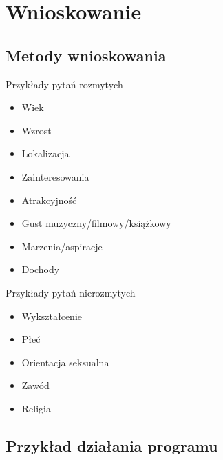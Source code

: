 \documentclass{beamer}
\begin{document}
\section{Wnioskowanie}

\subsection{Metody wnioskowania}

\begin{frame}

	\begin{block}{Przykłady pytań rozmytych}
		\begin{itemize}
		    \item Wiek
	        \item Wzrost
            \item Lokalizacja
            \item Zainteresowania
            \item Atrakcyjność
            \item Gust muzyczny/filmowy/książkowy
            \item Marzenia/aspiracje
            \item Dochody
		\end{itemize}
	\end{block}

\end{frame}

\begin{frame}

	\begin{block}{Przykłady pytań nierozmytych}
		\begin{itemize}
		    \item Wykształcenie
            \item Płeć
            \item Orientacja seksualna
            \item Zawód
            \item Religia
		\end{itemize}
	\end{block}

\end{frame}

\subsection{Przykład działania programu}
\end{document}

